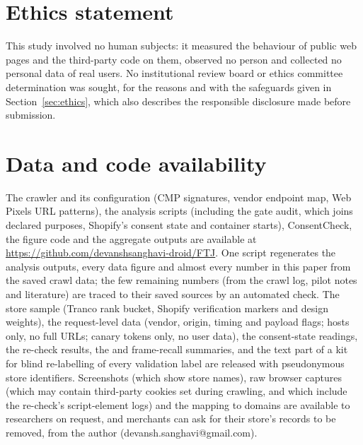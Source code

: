 
\section*{Ethics statement}
This study involved no human subjects: it measured the behaviour of public web pages and the third-party code on them, observed no person and collected no personal data of real users. No institutional review board or ethics committee determination was sought, for the reasons and with the safeguards given in Section~\ref{sec:ethics}, which also describes the responsible disclosure made before submission.

\section*{Data and code availability}
The crawler and its configuration (CMP signatures, vendor endpoint map, Web Pixels URL patterns), the analysis scripts (including the gate audit, which joins declared purposes, Shopify's consent state and container starts), ConsentCheck, the figure code and the aggregate outputs are available at \url{https://github.com/devanshsanghavi-droid/FTJ}. One script regenerates the analysis outputs, every data figure and almost every number in this paper from the saved crawl data; the few remaining numbers (from the crawl log, pilot notes and literature) are traced to their saved sources by an automated check. The store sample (Tranco rank bucket, Shopify verification markers and design weights), the request-level data (vendor, origin, timing and payload flags; hosts only, no full URLs; canary tokens only, no user data), the consent-state readings, the re-check results, the  and frame-recall summaries, and the text part of a kit for blind re-labelling of every validation label are released with pseudonymous store identifiers. Screenshots (which show store names), raw browser captures (which may contain third-party cookies set during crawling, and which include the re-check's script-element logs) and the mapping to domains are available to researchers on request, and merchants can ask for their store's records to be removed, from the author (devansh.sanghavi@gmail.com).

